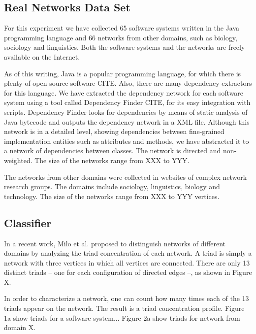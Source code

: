 \subsection{Real Networks Data Set}

For this experiment we have collected 65 software systems written in the Java
programming language and 66 networks from other domains, such as biology,
sociology and linguistics. Both the software systems and the networks are freely
available on the Internet.

As of this writing, Java is a popular programming language, for which there is
plenty of open source software CITE. Also, there are many dependency extractors
for this language. We have extracted the dependency network for each software
system using a tool called Dependency Finder CITE, for its easy integration with
scripts. Dependency Finder looks for dependencies by means of static analysis of
Java bytecode and outputs the dependency network in a XML file. Although this
network is in a detailed level, showing dependencies between fine-grained
implementation entities such as attributes and methods, we have abstracted it to
a network of dependencies between classes. The network is directed and
non-weighted. The size of the networks range from XXX to YYY.


The networks from other domains were collected in websites of complex network
research groups. The domains include sociology, linguistics, biology and
technology. The size of the networks range from XXX to YYY vertices.

\subsection{Classifier} %

In a recent work, Milo et al. proposed to distinguish networks of different
domains by analyzing the triad concentration of each network. A triad is simply
a network with three vertices in which all vertices are connected. There are
only 13 distinct triads -- one for each configuration of directed edges --, as
shown in Figure X.


In order to characterize a network, one can count how many times each of the
13 triads appear on the network. The result is a triad concentration profile.
Figure 1a show triads for a software system... Figure 2a show triads for network
from domain X.

